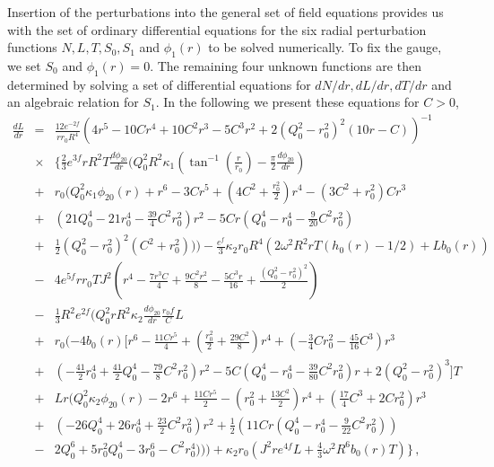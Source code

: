 \documentclass[aps,prd,12pt,superscriptaddress]{revtex4-2}
\begin{document}
Insertion of the perturbations into the general set of field equations provides us with the set of ordinary differential equations for the six radial perturbation functions $N, L, T, {S}_0, {S}_1$ and $\phi_1(r)$ to be solved numerically.
To fix the gauge, we set ${S}_0$ and $\phi_1(r)=0$.
The remaining four unknown functions are then determined by solving a set of differential equations for $dN/dr, dL/dr, dT/dr$ and an algebraic relation for ${S}_1$.
In the following we present these equations for $C>0$,
\begin{eqnarray}
\frac{dL}{dr}
&=&
    \frac{12  { e}^{-2f}}
      { r {r_0} R^4 }
      \left(4r^{5}-10 {C} r^{4}+ 10 {C}^{2} r^{3} - 5  {C}^{3} r^{2}
      +2  ({Q_0^2} -{r_0^2} )^{2}  (10r 
      - {C} )  \right)^{-1}
      \nonumber
      \\ 
 & \times &
   \big\{   
    \frac{2}{3}    { e}^{3f} r R^2 T \frac{d \phi_{20}}{d r} 
    \big(
    Q_0^2 R^2
   \kappa_1 
     (\tan^{-1} (\frac{r}{{r_0}}) 
    -\frac{\pi}{2} \frac{d\phi_{20}}{d r}  ) 
     \nonumber
      \\ 
&    +& {r_0} (Q_0^2 
   \kappa_1 
    \phi_{20} (r)
    +r^{6}-3 {C} r^{5}
    +(4 {C}^{2}+\frac{r_0^{2}}{2}) r^{4}-(3 {C}^{2}+ r_0^{2}) Cr^{3}
     \nonumber
      \\ 
    &+& (21 Q_0^{4}-21 r_0^{4}-\frac{39}{4} {C}^{2} r_0^{2}) r^{2}
    -5 {C}r (Q_0^{4}-r_0^{4}-\frac{9}{20} {C}^{2} r_0^{2})  
     \nonumber
      \\ 
    &+&\frac{1}{2} ({Q_0^2} -{r_0^2} )^{2}  ({C}^{2}+r_0^{2}))  
    \big)
    -\frac{{ e}^{f} }{3}  \kappa_2 {r_0} R^4 
    (2 \omega^{2} 
    R^2 r T ({h_0} (r )-1/2 )  +L {b_0} (r )) 
     \nonumber
      \\ 
    &-& 4 { e}^{5f} r  {r_0} T J^{2} 
    (r^{4}-\frac{7 r^{3} {C}}{4}+\frac{9 {C}^{2} r^{2}}{8}-\frac{5 {C}^{3} r}{16}+\frac{({Q_0^2} -{r_0^2} )^{2}  }{2}) 
     \nonumber
      \\ 
    &-& \frac{1}{3} R^2 { e}^{2f}   
    \big( Q_0^2 r 
    R^2 \kappa_2  \frac{d\phi_{20}}{d r} 
     \frac{r_0f}{C}  L
     \nonumber
      \\ 
    &+& {r_0} (-4 {b_0} (r ) [r^{6}-\frac{11 {C} r^{5}}{4}+(\frac{r_0^{2}}{2}+\frac{29 {C}^{2}}{8}) r^{4}+(-\frac{3}{4} {C} r_0^{2}-\frac{45}{16} {C}^{3}) r^{3}
     \nonumber
      \\ 
    &+& (-\frac{41}{2} r_0^{4}
    +\frac{41}{2} Q_0^{4}-\frac{79}{8} {C}^{2} r_0^{2}) r^{2}-5 {C} (Q_0^{4}-r_0^{4}-\frac{39}{80} {C}^{2} r_0^{2}) r +2 ({Q_0^2} -{r_0^2} )^{3} ] T
     \nonumber
      \\ 
   & + & L r (Q_0^2 \kappa_2 \phi_{20} (r )-2 r^{6}
    +\frac{11 {C} r^{5}}{2}
    -(r_0^{2}+\frac{13 {C}^{2}}{2}) r^{4}+(\frac{17}{4} {C}^{3}+2 {C} r_0^{2}) r^{3}
         \nonumber
     \\ 
    &+& (-26 Q_0^{4}+26 r_0^{4}+\frac{23}{2} {C}^{2} r_0^{2}) r^{2}
    +\frac{1}{2} (11 {C} r (Q_0^{4}-r_0^{4}-\frac{9}{22} {C}^{2} r_0^{2}) )
      \nonumber
      \\ 
    &-& 2 Q_0^{6}+5 r_0^{2} Q_0^{4}-3 r_0^{6}-{C}^{2} r_0^{4}))  \big) 
    + \kappa_2 {r_0}  
    (J^{2} r  { e}^{4f} L +\frac{4}{3} \omega^{2} R^6  {b_0} (r ) T  ) 
    \big\} \, ,
    \label{dL_withc}
\end{eqnarray}
\end{document}
